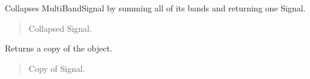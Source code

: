 \documentclass[letterpaper,10pt,english]{sphinxmanual}
\begin{document}
\begin{fulllineitems}
\begin{fulllineitems}
\label{\detokenize{classes:dsptoolbox.classes.multibandsignal.MultiBandSignal.collapse}}
\pysigstartsignatures
{}
\pysigstopsignatures
\sphinxAtStartPar
Collapses MultiBandSignal by summing all of its bands and returning
one Signal.
\begin{quote}\begin{description}
\begin{description}
\sphinxlineitem{\sphinxstylestrong{new\_sig}}{[}\sphinxtitleref{Signal}{]}
\sphinxAtStartPar
Collapsed Signal.

\end{description}

\end{description}\end{quote}

\end{fulllineitems}


\begin{fulllineitems}
\label{\detokenize{classes:dsptoolbox.classes.multibandsignal.MultiBandSignal.copy}}
\pysigstartsignatures
{}
\pysigstopsignatures
\sphinxAtStartPar
Returns a copy of the object.
\begin{quote}\begin{description}
\begin{description}
\sphinxlineitem{\sphinxstylestrong{new\_sig}}{[}\sphinxtitleref{MultiBandSignal}{]}
\sphinxAtStartPar
Copy of Signal.

\end{description}

\end{description}\end{quote}

\end{fulllineitems}



\end{fulllineitems}
\end{document}
